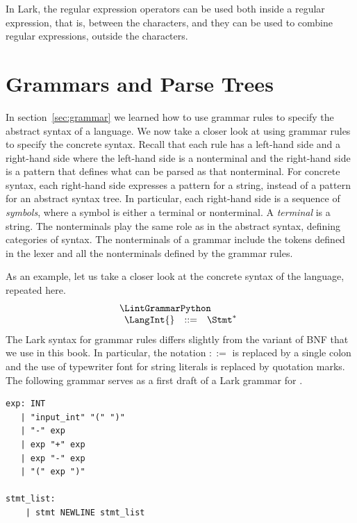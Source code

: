 \documentclass[7x10]{TimesAPriori_MIT}%
\numberwithin{theorem}{chapter}
\numberwithin{definition}{chapter}
\numberwithin{equation}{chapter}
\begin{document}
{\noindent In Lark, the regular expression operators can be used both
inside a regular expression, that is, between the \code{/} characters,
and they can be used to combine regular expressions, outside the
\code{/} characters.

\section{Grammars and Parse Trees}
\label{sec:CFG}

In section~\ref{sec:grammar} we learned how to use grammar rules to
specify the abstract syntax of a language. We now take a closer look
at using grammar rules to specify the concrete syntax. Recall that
each rule has a left-hand side and a right-hand side where the
left-hand side is a nonterminal and the right-hand side is a pattern
that defines what can be parsed as that nonterminal.
For concrete syntax, each right-hand side expresses a pattern for a
string, instead of a pattern for an abstract syntax tree. In
particular, each right-hand side is a sequence of
\emph{symbols}, where a symbol is either a
terminal or nonterminal. A \emph{terminal} is
a string. The nonterminals play the same role as in the abstract
syntax, defining categories of syntax. The nonterminals of a grammar
include the tokens defined in the lexer and all the nonterminals
defined by the grammar rules.

As an example, let us take a closer look at the concrete syntax of the
\LangInt{} language, repeated here.
\[
\begin{array}{l}
  \LintGrammarPython  \\
  \begin{array}{rcl}
    \LangInt{} &::=& \Stmt^{*}
  \end{array}
\end{array}
\]
The Lark syntax for grammar rules differs slightly from the variant of
BNF that we use in this book. In particular, the notation $::=$ is
replaced by a single colon and the use of typewriter font for string
literals is replaced by quotation marks. The following grammar serves
as a first draft of a Lark grammar for \LangInt{}.
\begin{center}
\begin{minipage}{0.95\textwidth}
\begin{lstlisting}[escapechar=$]
exp: INT
   | "input_int" "(" ")"
   | "-" exp
   | exp "+" exp
   | exp "-" exp
   | "(" exp ")"

stmt_list:
    | stmt NEWLINE stmt_list


\end{lstlisting}
\end{minipage}
\end{center}}
\end{document}
